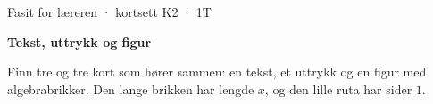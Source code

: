 \documentclass[11pt,a4paper]{article}
\begin{document}
\begin{minipage}[t]{0.8\linewidth}\vspace{0pt}
{\sffamily\small\color{dempet}Fasit for læreren · kortsett K2 · 1T}\par\vspace{0.25em}
{\fontsize{20}{24}\selectfont\bfseries Tekst, uttrykk og figur}\par\vspace{0.5em}
Finn tre og tre kort som hører sammen: en tekst, et uttrykk og en figur med algebrabrikker. Den lange brikken har lengde $x$, og den lille ruta har sider $1$.\par{}
\end{minipage}\hfill
\begin{minipage}[t]{0.15\linewidth}\vspace{0pt}\raggedleft
{}
\end{minipage}\par\vspace{0.8em}
\end{document}
